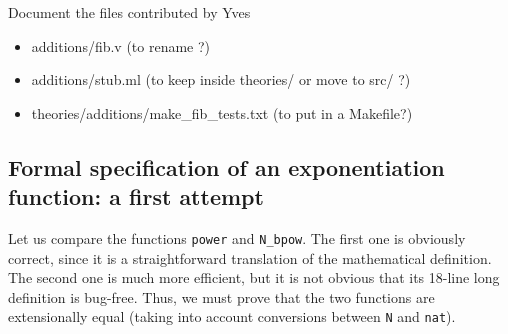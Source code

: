 




\begin{todo}
Document the files contributed by Yves
\begin{itemize}
\item additions/fib.v (to rename ?)
\item additions/stub.ml (to keep inside theories/ or move to src/ ?)
\item theories/additions/make\_fib\_tests.txt (to put in a Makefile?)
\end{itemize}
\end{todo}











\subsection{Formal specification of an exponentiation function: a first attempt}

Let us compare the functions \texttt{power} and \texttt{N\_bpow}.
The first one is obviously correct, since it is a straightforward translation of the mathematical definition.
The second one is much more efficient, but it is not obvious  that its 18-line long definition is bug-free.
Thus, we must prove that the two functions are extensionally equal (taking into account conversions
between \texttt{N} and \texttt{nat}).

